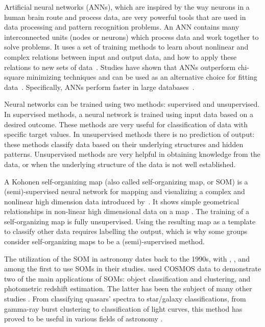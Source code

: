 Artificial neural networks (ANNs), which are inspired by the way neurons in a human brain route and process data, are very powerful tools that are used in data processing and pattern recognition problems.
An ANN contains many interconnected units (nodes or neurons) which process data and work together to solve problems.
It uses a set of training methods to learn about nonlinear and complex relations between input and output data, and how to apply these relations to new sets of data~\citep[e.g.][]{Hossein14,Hossein16a,Hossein16b,Ellison16a, Ellison16b}.
Studies have shown that ANNs outperform chi-square minimizing techniques and can be used as an alternative choice for fitting data~\citep[e.g.][]{Marquez91}.
Specifically, ANNs perform faster in large databases~\citep[][]{Gulati97}.


Neural networks can be trained using two methods: supervised and unsupervised.
In supervised methods, a neural network is trained using input data based on a desired outcome.
These methods are very useful for classification of data with specific target values.
In unsupervised methods there is no prediction of output:
these methods classify data based on their underlying structures and hidden patterns.
Unsupervised methods are very helpful in obtaining knowledge from the data, or when the underlying structure of the data is not well established.


A Kohonen self-organizing map (also called self-organizing map, or SOM) is a (semi)-supervised neural network for mapping and visualizing a complex and nonlinear high dimension data introduced by~\citet{Kohonen82}.
It shows simple geometrical relationships in non-linear high dimensional data on a map \citep{Kohonen98}.
The training of a self-organizing map is fully unsupervised.
     Using the resulting map as a template to classify other data requires labelling the output, which is why some groups consider self-organizing maps to be a (semi)-supervised method.



The utilization of the SOM in astronomy dates back to the 1990s, with \citet[][]{Odewahn92}, \citet[][]{Hernandez94}, and \citet[][]{Murtagh95} among the first to use SOMs in their studies.
\citet{Geach12} used COSMOS data to demonstrate two of the main applications of SOMs: object classification and clustering, and photometric redshift estimation. The latter has been the subject of many other studies \citep[e.g.][]{Kind14a}.
From classifying quasars' spectra to star/galaxy classifications, from gamma-ray burst clustering to classification of light curves, this method has proved to be useful in various fields of astronomy \citep[e.g.][]{Maehoenen95, Miller96, Andreon00, Balastegui01, Rajaniemi02, Brett04, Scaringi09}.



